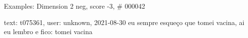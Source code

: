 \begin{frame}{Examples: Dimension 2 neg, score -3, \# 000042}
\footnotesize
\begin{alertblock}{text: t075361, user: unknown, 2021-08-30}
eu sempre esqueço que tomei vacina, ai eu lembro e fico: tomei vacina 
  
 \textbf{} 
\textbf{}  
\end{alertblock}
\end{frame}
